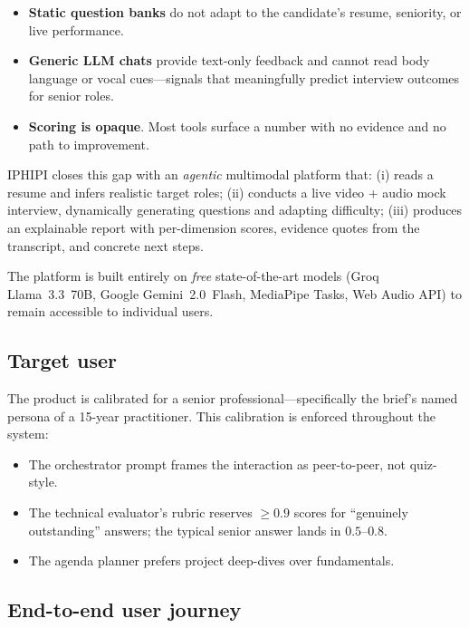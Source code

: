 \documentclass[11pt,a4paper]{article}
\begin{document}
\begin{itemize}
  \item \textbf{Static question banks} do not adapt to the candidate's resume,
        seniority, or live performance.
  \item \textbf{Generic LLM chats} provide text-only feedback and cannot read
        body language or vocal cues---signals that meaningfully predict
        interview outcomes for senior roles.
  \item \textbf{Scoring is opaque}. Most tools surface a number with no
        evidence and no path to improvement.
\end{itemize}

IPHIPI closes this gap with an \emph{agentic} multimodal platform that:
(i) reads a resume and infers realistic target roles;
(ii) conducts a live video + audio mock interview, dynamically generating
questions and adapting difficulty;
(iii) produces an explainable report with per-dimension scores, evidence
quotes from the transcript, and concrete next steps.

The platform is built entirely on \emph{free} state-of-the-art models
(Groq Llama~3.3~70B, Google Gemini~2.0~Flash, MediaPipe Tasks, Web Audio API)
to remain accessible to individual users.

\subsection{Target user}

The product is calibrated for a senior professional---specifically the brief's
named persona of a 15-year practitioner. This calibration is enforced
throughout the system:
\begin{itemize}
  \item The orchestrator prompt frames the interaction as peer-to-peer,
        not quiz-style.
  \item The technical evaluator's rubric reserves $\geq 0.9$ scores for
        ``genuinely outstanding'' answers; the typical senior answer
        lands in $0.5$--$0.8$.
  \item The agenda planner prefers project deep-dives over fundamentals.
\end{itemize}

\subsection{End-to-end user journey}
\end{document}
